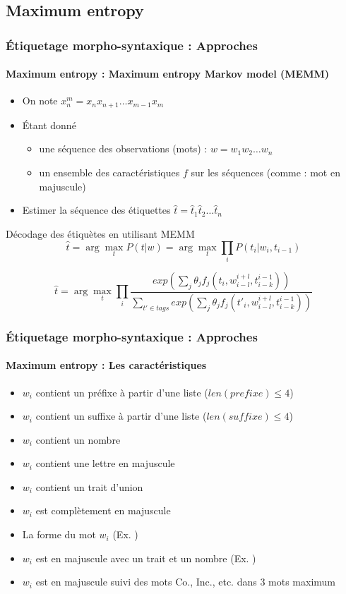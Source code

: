 \documentclass[xcolor=table]{beamer}
\begin{document}
\subsection{Maximum entropy}

\begin{frame}
\frametitle{Étiquetage morpho-syntaxique : Approches}
\framesubtitle{Maximum entropy : Maximum entropy Markov model (MEMM)}

\begin{itemize}
	\item On note $x_{n}^{m} = x_n x_{n+1} \ldots x_{m-1} x_m$
	\item Étant donné 
	\begin{itemize}
		\item une séquence des observations (mots) : $w = w_1 w_2 \ldots w_n$
		\item un ensemble des caractéristiques $f$ sur les séquences (comme : mot en majuscule)
	\end{itemize}
	\item Estimer la séquence des étiquettes $\hat{t} = \hat{t}_1 \hat{t}_2 \ldots \hat{t}_n$
\end{itemize}

\begin{block}{Décodage des étiquètes en utilisant MEMM}
	\[
	\hat{t} = \arg\max\limits_t P(t | w) = \arg\max\limits_t \prod\limits_{i}  P(t_i | w_i, t_{i-1})
	\]
	
	\[
	\hat{t} = \arg\max\limits_t \prod\limits_{i}  
	\frac{exp\left(\sum_j \theta_j f_j(t_i, w_{i-l}^{i+l}, t_{i-k}^{i-1})\right)}%
	{\sum_{t' \in tags} exp\left(\sum_j \theta_j f_j(t'_i, w_{i-l}^{i+l}, t_{i-k}^{i-1})\right)}
	\]

\end{block}

\end{frame}

\begin{frame}
\frametitle{Étiquetage morpho-syntaxique : Approches}
\framesubtitle{Maximum entropy : Les caractéristiques}

\begin{itemize}
	\item $w_i$ contient un préfixe à partir d'une liste ($len(prefixe) \le 4$) 
	\item $w_i$ contient un suffixe à partir d'une liste ($len(suffixe) \le 4$) 
	\item $w_i$ contient un nombre 
	\item $w_i$ contient une lettre en majuscule
	\item $w_i$ contient un trait d'union 
	\item $w_i$ est complètement en majuscule
	\item La forme du mot $w_i$ (Ex. ) 
	\item $w_i$ est en majuscule avec un trait et un nombre (Ex. ) 
	\item $w_i$ est en majuscule suivi des mots Co., Inc., etc. dans 3 mots maximum
\end{itemize}

\end{frame}
\end{document}
